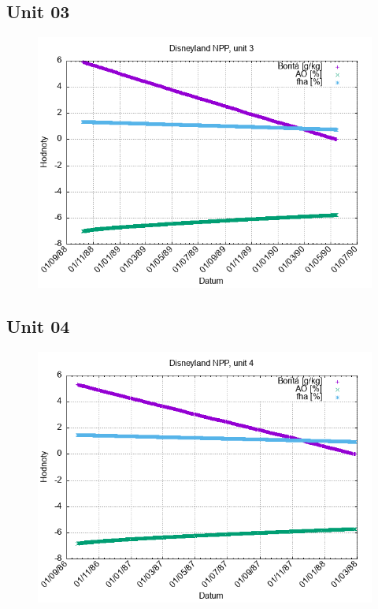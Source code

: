 \documentclass{article}
\begin{document}
\subsection*{Unit 03}
\begin{figure}[h!]
\centering
\includegraphics[width=14cm]{./grafy/Disneyland03.png}
\end{figure}
\clearpage
\subsection*{Unit 04}
\begin{figure}[h!]
\centering
\includegraphics[width=14cm]{./grafy/Disneyland04.png}
\end{figure}
\clearpage
\end{document}
